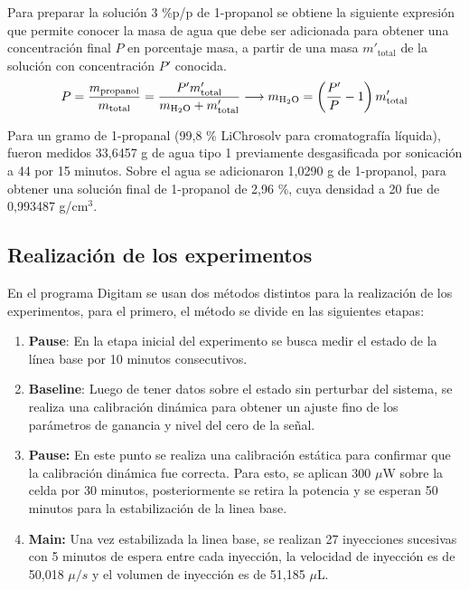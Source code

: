 	Para preparar la soluci\'on 3 \%p/p de 1-propanol se obtiene la siguiente expresi\'on que permite conocer la masa de agua que debe ser adicionada para obtener una concentraci\'on final $P$ en porcentaje masa, a partir de una masa $m'_\text{total}$ de la soluci\'on con concentraci\'on $P'$ conocida.
	\begin{equation}\label{eq: massConcentration}
		P = \dfrac{m_\text{propanol}}{m_\text{total}} = \dfrac{P'm'_\text{total}}{m_\text{\ce{H2O}} + m'_\text{total}} \longrightarrow m_\text{\ce{H2O}} = \left(\dfrac{P'}{P} -1\right)m'_\text{total}
	\end{equation}
	
	Para un gramo de 1-propanal (99,8 \% LiChrosolv para cromatograf\'ia l\'iquida), fueron medidos 33,6457 g de agua tipo 1 previamente desgasificada por sonicaci\'on a 44 \grad{} por 15 minutos. Sobre el agua se adicionaron 1,0290 g de 1-propanol, para obtener una soluci\'on final de 1-propanol de 2,96 \%, cuya densidad a 20 \grad{} fue de 0,993487 g/cm$^3$.
	
	\subsection{Realizaci\'on de los experimentos}\label{sec: method}
	En el programa Digitam se usan dos m\'etodos distintos para la realizaci\'on de los experimentos, para el primero, el m\'etodo se divide en las siguientes etapas:
	\begin{enumerate}
		\item \textbf{Pause}: En la etapa inicial del experimento se busca medir el estado de la línea base por 10 minutos consecutivos.
		\item \textbf{Baseline}: Luego de tener datos sobre el estado sin perturbar del sistema, se realiza una calibración dinámica para obtener un ajuste fino de los parámetros de ganancia y nivel del cero de la señal. 
		\item \textbf{Pause:} En este punto se realiza una calibraci\'on est\'atica para confirmar que la calibraci\'on din\'amica fue correcta. Para esto, se aplican 300 $\mu$W sobre la celda por 30 minutos, posteriormente se retira la potencia y se esperan 50 minutos para la estabilizaci\'on de la linea base.
		\item \textbf{Main:} Una vez estabilizada la linea base, se realizan 27 inyecciones sucesivas con 5 minutos de espera entre cada inyecci\'on, la velocidad de inyecci\'on es de 50,018 $\mu/s$ y el volumen de inyecci\'on es de 51,185 $\mu$L.
	\end{enumerate}
	
